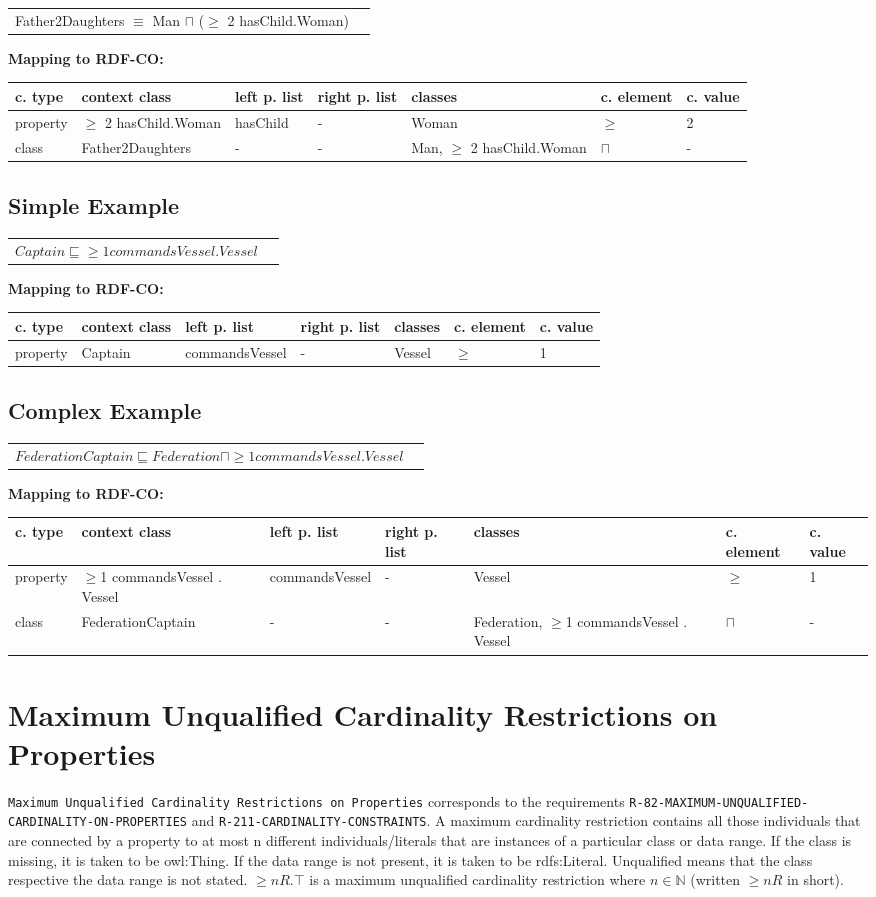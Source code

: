 \documentclass{llncs}
\newcommand{\ms}[1]{\texttt{#1}}
\newenvironment{gcotable}{
  \scriptsize
  \sffamily
  \vspace{0cm}
	\begin{center}
	\textbf{\vspace{0.4cm}Mapping to RDF-CO:} \\
  \begin{tabular}{l|l|l|l|l|l|l}
	\hline
  \textbf{c. type} & \textbf{context class} & \textbf{left p. list} & \textbf{right p. list} & \textbf{classes} & \textbf{c. element} & \textbf{c. value} \\
  \hline

}{
  \hline
  \end{tabular}
	\end{center}
}
\newenvironment{DL}{
  \vspace{0cm}
	\begin{center}
  \begin{tabular}{r l}

}{
  \end{tabular}
	\end{center}
}
\begin{document}
\begin{DL}
Father2Daughters $\equiv$ Man $\sqcap$ ($\geq$ 2 hasChild.Woman)
\end{DL}

\begin{gcotable}
property & $\geq$ 2 hasChild.Woman & hasChild & - & Woman & $\geq$ & 2 \\
class & Father2Daughters & - & - & Man, $\geq$ 2 hasChild.Woman & $\sqcap$ & - \\
\end{gcotable}

\subsection{Simple Example}

\begin{DL}
$Captain \sqsubseteq \geq1 commandsVessel . Vessel $
\end{DL}

\begin{gcotable}
property & Captain & commandsVessel & - & Vessel & $\geq$ & 1 \\
\end{gcotable}

\subsection{Complex Example}

\begin{DL}
$FederationCaptain \sqsubseteq Federation \sqcap \geq1 commandsVessel . Vessel $
\end{DL}

\begin{gcotable}
property & $\geq$1 commandsVessel . Vessel & commandsVessel & - & Vessel & $\geq$ & 1 \\
class & FederationCaptain & - & - & Federation, $\geq$1 commandsVessel . Vessel & $\sqcap$ & - \\
\end{gcotable}

\section{Maximum Unqualified Cardinality Restrictions on Properties}

\ms{Maximum Unqualified Cardinality Restrictions on Properties} corresponds to the requirements 
\ms{R-82-MAXIMUM-UNQUALIFIED-CARDINALITY-ON-PROPERTIES} and \ms{R-211-CARDINALITY-CONSTRAINTS}.
A maximum cardinality restriction contains all those individuals that are connected by a property to at most n different individuals/literals that are instances of a particular class or data range. If the class is missing, it is taken to be owl:Thing. If the data range is not present, it is taken to be rdfs:Literal.
Unqualified means that the class respective the data range is not stated. 
$\geq n R. \top$ is a maximum unqualified cardinality restriction where $n \in \mathbb{N}$ (written $\geq  n R$ in short).
\end{document}

